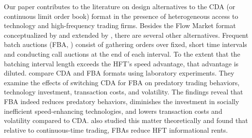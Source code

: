 


Our paper contributes to the literature on design alternatives to the CDA (or continuous limit order book)  format in the presence of heterogeneous access to technology and high-frequency trading firms. 
Besides the Flow Market format conceptualized by \cite{Kyle2017} and extended by \cite{Budish2023},
there are several other alternatives.
Frequent batch auctions (FBA, \citealp{Budish2015}) consist of gathering orders over fixed, short time intervals and conducting call auctions at the end of each interval. To the extent that the batching interval length exceeds the HFT's speed advantage, that advantage is diluted. \cite{Aldrich2019} compare CDA and FBA formats using laboratory experiments. They examine the effects of switching CDA for FBA on predatory trading behaviors, technology investment, transaction costs, and volatility. The findings reveal that FBA indeed reduces predatory behaviors, diminishes the investment in socially inefficient speed-enhancing technologies, and lowers transaction costs and volatility compared to CDA. \cite{Haas2021} also studied this matter theoretically and found that relative to continuous-time trading, FBAs reduce HFT informational rents.

